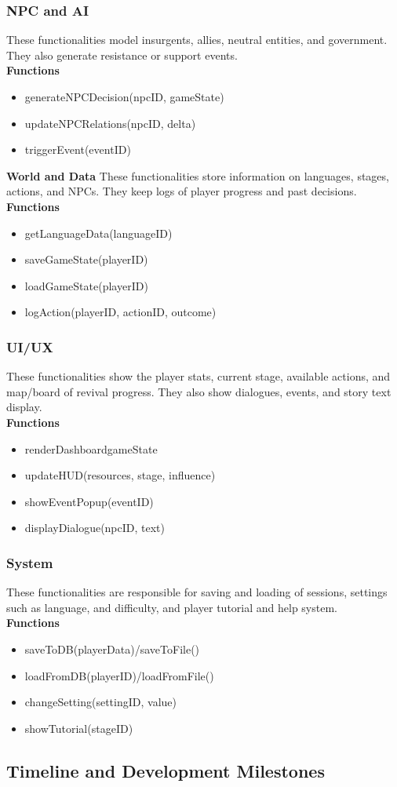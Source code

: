 \documentclass[11pt]{article}
\begin{document}
\subsubsection{NPC and AI}
These functionalities model insurgents, allies, neutral entities, and government. They also generate resistance or support events.\\

\textbf{Functions}
\begin{itemize}
\item
  generateNPCDecision(npcID, gameState)
\item
  updateNPCRelations(npcID, delta)
\item
  triggerEvent(eventID)
\end{itemize}

\textbf{World and Data}
These functionalities store information on languages, stages, actions, and NPCs. They keep logs of player progress and past decisions.\\

\textbf{Functions}
\begin{itemize}
\item
  getLanguageData(languageID)
\item
  saveGameState(playerID)
\item
  loadGameState(playerID)
\item
  logAction(playerID, actionID, outcome)
\end{itemize}

\subsubsection{UI/UX}
These functionalities show the player stats, current stage, available actions, and map/board of revival progress. They also show dialogues, events, and story text display.\\

\textbf{Functions}
\begin{itemize}
\item
  renderDashboard{gameState}
\item
  updateHUD(resources, stage, influence)
\item
  showEventPopup(eventID)
\item
  displayDialogue(npcID, text)
\end{itemize}

\subsubsection{System}
These functionalities are responsible for saving and loading of sessions, settings such as language, and difficulty, and player tutorial and help system.\\

\textbf{Functions}
\begin{itemize}
\item
  saveToDB(playerData)/saveToFile()
\item
  loadFromDB(playerID)/loadFromFile()
\item
  changeSetting(settingID, value)
\item
  showTutorial(stageID)
\end{itemize}

\subsection{Timeline and Development Milestones}
\end{document}
